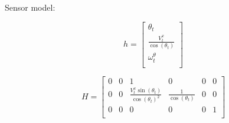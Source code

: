 \documentclass[12pt]{article}
\begin{document}
Sensor model:

\[
h=
 \begin{bmatrix}
  \theta_t \\
  \frac{V_t^x}{\cos(\theta_t)} \\
  \omega_t^\theta \\
 \end{bmatrix}
\]

$$
H=
 \begin{bmatrix}
  0 & 0 & 1 & 0 & 0 & 0\\
  0 & 0 & \frac{V_t^x\sin(\theta_t)}{\cos(\theta_t)^2} & \frac{1}{\cos(\theta_t)} & 0 & 0\\
  0 & 0 & 0 & 0 & 0 & 1\\
 \end{bmatrix}
$$
\end{document}

